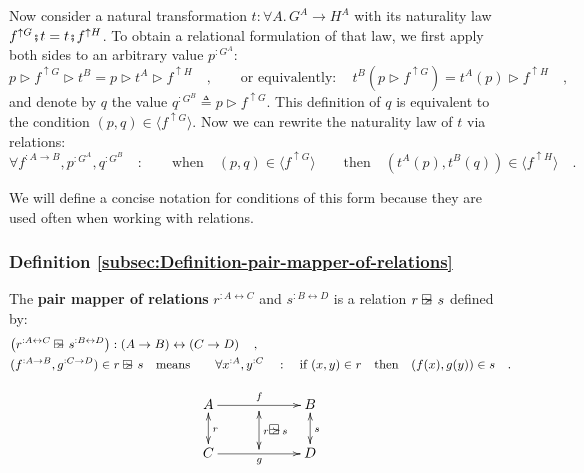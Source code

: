 Now consider a natural transformation $t:\forall A.\,G^{A}\rightarrow H^{A}$
with its naturality law $f^{\uparrow G}\bef t=t\bef f^{\uparrow H}$.
To obtain a relational formulation of that law, we first apply both
sides to an arbitrary value $p^{:G^{A}}$:
\[
p\triangleright f^{\uparrow G}\triangleright t^{B}=p\triangleright t^{A}\triangleright f^{\uparrow H}\quad,\quad\quad\text{or equivalently}:\quad t^{B}(p\triangleright f^{\uparrow G})=t^{A}(p)\triangleright f^{\uparrow H}\quad,
\]
and denote by $q$ the value $q^{:G^{B}}\triangleq p\triangleright f^{\uparrow G}$.
This definition of $q$ is equivalent to the condition $(p,q)\in\langle f^{\uparrow G}\rangle$.
Now we can rewrite the naturality law of $t$ via relations: 
\begin{equation}
\forall f^{:A\rightarrow B},p^{:G^{A}},q^{:G^{B}}\quad:\quad\quad\text{when}\quad(p,q)\in\langle f^{\uparrow G}\rangle\quad\quad\text{then}\quad(t^{A}(p),t^{B}(q))\in\langle f^{\uparrow H}\rangle\quad.\label{eq:naturality-law-of-t-derivation1}
\end{equation}

We will define a concise notation for conditions of this form because
they are used often when working with relations.

\subsubsection{Definition \label{subsec:Definition-pair-mapper-of-relations}\ref{subsec:Definition-pair-mapper-of-relations}}

The \textbf{pair mapper of relations}
$r^{:A\leftrightarrow C}$ and $s^{:B\leftrightarrow D}$ is a relation
$r\varogreaterthan s$ defined by:
\begin{align*}
 & \big(r^{:A\leftrightarrow C}\varogreaterthan s^{:B\leftrightarrow D}\big):\left(A\rightarrow B\right)\leftrightarrow\left(C\rightarrow D\right)\quad,\\
 & (f^{:A\rightarrow B},g^{:C\rightarrow D})\in r\varogreaterthan s\quad\text{means}\quad\quad\forall x^{:A},y^{:C}\quad:\quad\text{if }(x,y)\in r\quad\text{then}\quad(f(x),g(y))\in s\quad.
\end{align*}

\begin{wrapfigure}{i}{0.2\columnwidth}%
\vspace{-2.8\baselineskip}
\[
\xymatrix{\xyScaleY{1.8pc}\xyScaleX{2.2pc}A\ar@{<->}[d]\sp(0.5){r}\ar[rr]\sp(0.5){f} & \ar@{<->}[d(0.9)]\sp(0.55){r\varogreaterthan s} & B\ar@{<->}[d]\sp(0.5){s}\\
C\ar[rr]\sb(0.5){g} &  & D
}
\]

\vspace{-2.5\baselineskip}
\end{wrapfigure}%


